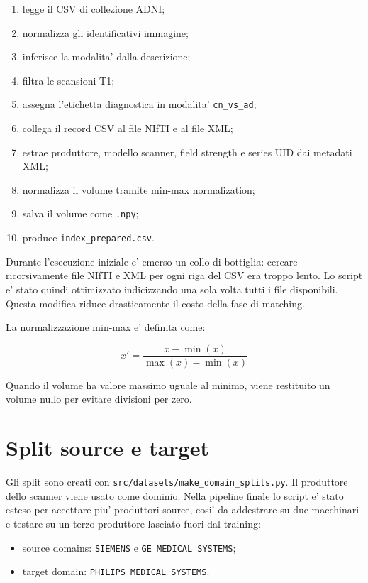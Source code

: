 \documentclass[12pt,a4paper]{article}
\begin{document}
\begin{enumerate}[leftmargin=1.2cm]
    \item legge il CSV di collezione ADNI;
    \item normalizza gli identificativi immagine;
    \item inferisce la modalita' dalla descrizione;
    \item filtra le scansioni T1;
    \item assegna l'etichetta diagnostica in modalita' \texttt{cn\_vs\_ad};
    \item collega il record CSV al file NIfTI e al file XML;
    \item estrae produttore, modello scanner, field strength e series UID dai metadati XML;
    \item normalizza il volume tramite min-max normalization;
    \item salva il volume come \texttt{.npy};
    \item produce \texttt{index\_prepared.csv}.
\end{enumerate}

Durante l'esecuzione iniziale e' emerso un collo di bottiglia: cercare ricorsivamente file NIfTI e XML per ogni riga del CSV era troppo lento. Lo script e' stato quindi ottimizzato indicizzando una sola volta tutti i file disponibili. Questa modifica riduce drasticamente il costo della fase di matching.

La normalizzazione min-max e' definita come:

\[
x' = \frac{x - \min(x)}{\max(x) - \min(x)}
\]

Quando il volume ha valore massimo uguale al minimo, viene restituito un volume nullo per evitare divisioni per zero.

\section{Split source e target}

Gli split sono creati con \texttt{src/datasets/make\_domain\_splits.py}. Il produttore dello scanner viene usato come dominio. Nella pipeline finale lo script e' stato esteso per accettare piu' produttori source, cosi' da addestrare su due macchinari e testare su un terzo produttore lasciato fuori dal training:

\begin{itemize}[leftmargin=1.2cm]
    \item source domains: \texttt{SIEMENS} e \texttt{GE MEDICAL SYSTEMS};
    \item target domain: \texttt{PHILIPS MEDICAL SYSTEMS}.
\end{itemize}
\end{document}
